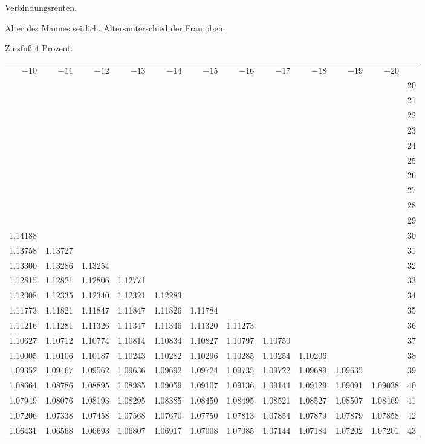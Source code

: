 \clearpage
{}
\begin{center}
Verbindungsrenten.\par\smallskip
Alter des Mannes seitlich. Altersunterschied der Frau oben.\par\smallskip
Zinsfuß \(4\) Prozent.\par\medskip
\fontsize{8}{10}\selectfont\setlength{\tabcolsep}{1.3pt}
\begin{tabular}{|rrrrrrrrrrr|r|}
\hline
\(-10\)&\(-11\)&\(-12\)&\(-13\)&\(-14\)&\(-15\)&\(-16\)&\(-17\)&\(-18\)&\(-19\)&\(-20\)&\\[8pt]
&&&&&&&&&&&20\\
&&&&&&&&&&&21\\
&&&&&&&&&&&22\\
&&&&&&&&&&&23\\
&&&&&&&&&&&24\\[5pt]
&&&&&&&&&&&25\\
&&&&&&&&&&&26\\
&&&&&&&&&&&27\\
&&&&&&&&&&&28\\
&&&&&&&&&&&29\\[5pt]
1.14188&&&&&&&&&&&30\\
1.13758&1.13727&&&&&&&&&&31\\
1.13300&1.13286&1.13254&&&&&&&&&32\\
1.12815&1.12821&1.12806&1.12771&&&&&&&&33\\
1.12308&1.12335&1.12340&1.12321&1.12283&&&&&&&34\\[5pt]
1.11773&1.11821&1.11847&1.11847&1.11826&1.11784&&&&&&35\\
1.11216&1.11281&1.11326&1.11347&1.11346&1.11320&1.11273&&&&&36\\
1.10627&1.10712&1.10774&1.10814&1.10834&1.10827&1.10797&1.10750&&&&37\\
1.10005&1.10106&1.10187&1.10243&1.10282&1.10296&1.10285&1.10254&1.10206&&&38\\
1.09352&1.09467&1.09562&1.09636&1.09692&1.09724&1.09735&1.09722&1.09689&1.09635&&39\\[5pt]
1.08664&1.08786&1.08895&1.08985&1.09059&1.09107&1.09136&1.09144&1.09129&1.09091&1.09038&40\\
1.07949&1.08076&1.08193&1.08295&1.08385&1.08450&1.08495&1.08521&1.08527&1.08507&1.08469&41\\
1.07206&1.07338&1.07458&1.07568&1.07670&1.07750&1.07813&1.07854&1.07879&1.07879&1.07858&42\\
1.06431&1.06568&1.06693&1.06807&1.06917&1.07008&1.07085&1.07144&1.07184&1.07202&1.07201&43\\

\end{tabular}
\end{center}
